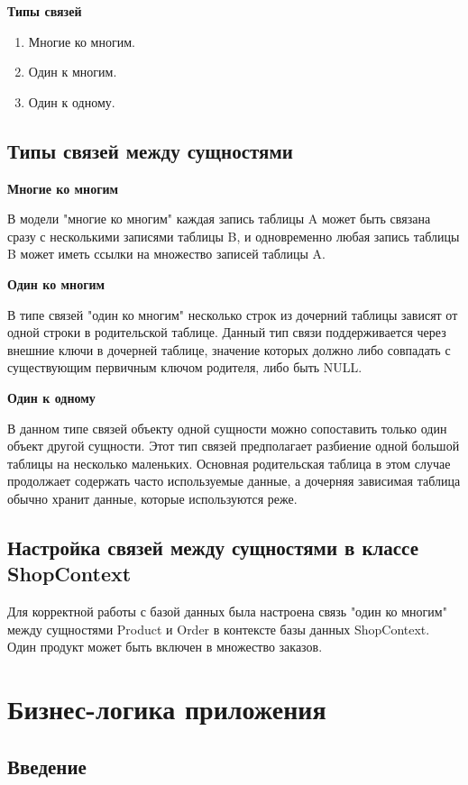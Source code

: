 \documentclass[a4paper,12pt]{report}
\begin{document}
\textbf{Типы связей}
\begin{enumerate}
    \item
        Многие ко многим.
    \item
        Один к многим.
    \item
        Один к одному.
\end{enumerate}

\subsection{Типы связей между сущностями}

\textbf{Многие ко многим}

В модели "многие ко многим" каждая запись таблицы A может быть связана сразу с несколькими записями таблицы B, 
и одновременно любая запись таблицы B может иметь ссылки на множество записей таблицы A.

\textbf{Один ко многим}

В типе связей "один ко многим" несколько строк из дочерний таблицы зависят от одной строки в родительской таблице.
Данный тип связи поддерживается через внешние ключи в дочерней таблице, значение которых должно либо совпадать 
с существующим первичным ключом родителя, либо быть NULL.

\textbf{Один к одному}

В данном типе связей объекту одной сущности можно сопоставить только один объект другой сущности.
Этот тип связей предполагает разбиение одной большой таблицы на несколько маленьких. 
Основная родительская таблица в этом случае продолжает содержать часто используемые данные, 
а дочерняя зависимая таблица обычно хранит данные, которые используются реже.

\subsection{Настройка связей между сущностями в классе ShopContext}

Для корректной работы с базой данных была настроена связь "один ко многим" между сущностями Product и Order 
в контексте базы данных ShopContext. Один продукт может быть включен в множество заказов.

\section{Бизнес-логика приложения}

\subsection{Введение}
\end{document}

